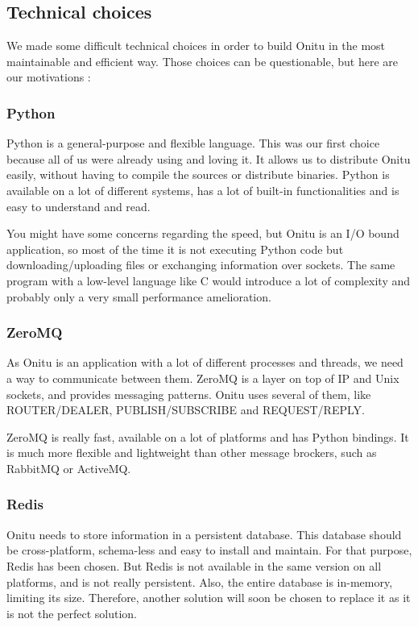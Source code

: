 \documentclass[letterpaper,10pt,english]{sphinxmanual}
\begin{document}
\subsection{Technical choices}
\label{intro:logbook}\label{intro:technical-choices}
We made some difficult technical choices in order to build Onitu in the most maintainable and efficient way. Those choices can be questionable, but here are our motivations :


\subsubsection{Python}
\label{intro:python}
Python is a general-purpose and flexible language. This was our first choice because all of us were already using and loving it. It allows us to distribute Onitu easily, without having to compile the sources or distribute binaries. Python is available on a lot of different systems, has a lot of built-in functionalities and is easy to understand and read.

You might have some concerns regarding the speed, but Onitu is an I/O bound application, so most of the time it is not executing Python code but downloading/uploading files or exchanging information over sockets. The same program with a low-level language like C would introduce a lot of complexity and probably only a very small performance amelioration.


\subsubsection{ZeroMQ}
\label{intro:zeromq}
As Onitu is an application with a lot of different processes and threads, we need a way to communicate between them. ZeroMQ is a layer on top of IP and Unix sockets, and provides messaging patterns. Onitu uses several of them, like ROUTER/DEALER, PUBLISH/SUBSCRIBE and REQUEST/REPLY.

ZeroMQ is really fast, available on a lot of platforms and has Python bindings. It is much more flexible and lightweight than other message brockers, such as RabbitMQ or ActiveMQ.


\subsubsection{Redis}
\label{intro:redis}
Onitu needs to store information in a persistent database. This database should be cross-platform, schema-less and easy to install and maintain. For that purpose, Redis has been chosen. But Redis is not available in the same version on all platforms, and is not really persistent. Also, the entire database is in-memory, limiting its size. Therefore, another solution will soon be chosen to replace it as it is not the perfect solution.
\end{document}
